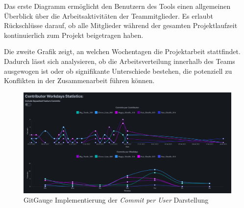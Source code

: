 Das erste Diagramm ermöglicht den Benutzern des Tools einen allgemeinen Überblick über die Arbeitsaktivitäten der Teammitglieder. Es erlaubt Rückschlüsse darauf, ob alle Mitglieder während der gesamten Projektlaufzeit kontinuierlich zum Projekt beigetragen haben.

Die zweite Grafik zeigt, an welchen Wochentagen die Projektarbeit stattfindet. Dadurch lässt sich analysieren, ob die Arbeitsverteilung innerhalb des Teams ausgewogen ist oder ob signifikante Unterschiede bestehen, die potenziell zu Konflikten in der Zusammenarbeit führen können.
\begin{figure}[htbp]
\includegraphics[width=\textwidth]{Figures/gitgauge_commits.png}
\caption{GitGauge Implementierung der \textit{Commit per User} Darstellung }
\label{fig:gitgauge_commits}
\end{figure}
